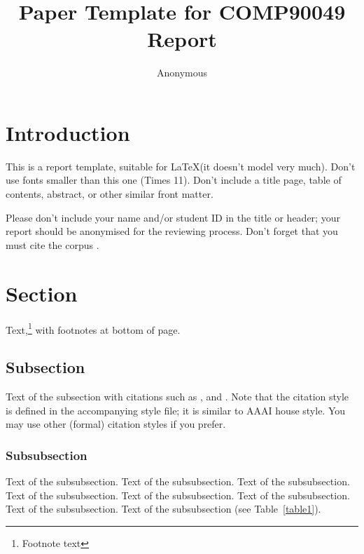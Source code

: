 \documentclass[11pt]{article}
\title{Paper Template for COMP90049 Report}
\author
{Anonymous}
\begin{document}
\maketitle



\section{Introduction}

This is a report template, suitable for \LaTeX (it doesn't model very much).
Don't use fonts smaller than this one (Times 11). Don't include a title page,
table of contents, abstract, or other similar front matter.

Please don't include your name and/or student ID in the title or header; 
your report should be anonymised for the reviewing process. Don't forget
that you must cite the corpus \cite{WikiMisspell}.


\section{Section}

Text,\footnote{Footnote text} with footnotes at bottom of page.


\subsection{Subsection}

Text of the subsection with citations such as 
,  and .
Note that the citation style is defined in the accompanying
style file; it is similar to AAAI house style. You may use
other (formal) citation styles if you prefer.

 
\subsubsection{Subsubsection}

Text of the subsubsection.
Text of the subsubsection.
Text of the subsubsection.
Text of the subsubsection.
Text of the subsubsection.
Text of the subsubsection.
Text of the subsubsection.
Text of the subsubsection (see Table~\ref{table1}).
\end{document}
